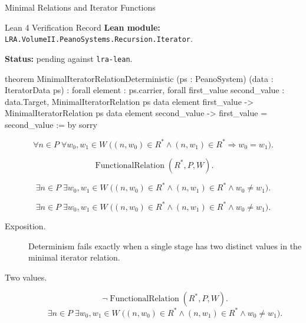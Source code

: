 \begin{topicbox}{Minimal Relations and Iterator Functions}
\begin{formalizationrecord}{Lean 4 Verification Record}
\textbf{Lean module:} \texttt{LRA.VolumeII.PeanoSystems.Recursion.Iterator}.\par
{}
\textbf{Status:} pending against \texttt{lra-lean}.\par

\begin{leancode}
theorem MinimalIteratorRelationDeterministic
    (ps : PeanoSystem)
    (data : IteratorData ps) :
    forall element : ps.carrier,
      forall first_value second_value : data.Target,
        MinimalIteratorRelation ps data element first_value ->
        MinimalIteratorRelation ps data element second_value ->
        first_value = second_value := by
  sorry
\end{leancode}
\end{formalizationrecord}

\begin{remark*}
\[
\forall n\in P\;\forall w_0,w_1\in W\;
\bigl((n,w_0)\in R^*\land (n,w_1)\in R^*\Longrightarrow w_0=w_1\bigr).
\]
\end{remark*}

\begin{remark*}
\[
\operatorname{FunctionalRelation}(R^*,P,W).
\]
\end{remark*}

\begin{remark*}
\[
\exists n\in P\;\exists w_0,w_1\in W\;
\bigl((n,w_0)\in R^*\land (n,w_1)\in R^*\land w_0\neq w_1\bigr).
\]
\end{remark*}

\begin{remark*}
\[
\exists n\in P\;\exists w_0,w_1\in W\;
\bigl((n,w_0)\in R^*\land (n,w_1)\in R^*\land w_0\neq w_1\bigr).
\]
\end{remark*}

\begin{remark*}
\begin{description}
  \item[Exposition.]
  Determinism fails exactly when a single stage has two distinct values in the
  minimal iterator relation.
  \item[Two values.]
  \[
  \neg\operatorname{FunctionalRelation}(R^*,P,W).
  \]
  \[
  \exists n\in P\;\exists w_0,w_1\in W\;
  \bigl((n,w_0)\in R^*\land (n,w_1)\in R^*\land w_0\neq w_1\bigr).
  \]
\end{description}
\end{remark*}


\end{topicbox}
